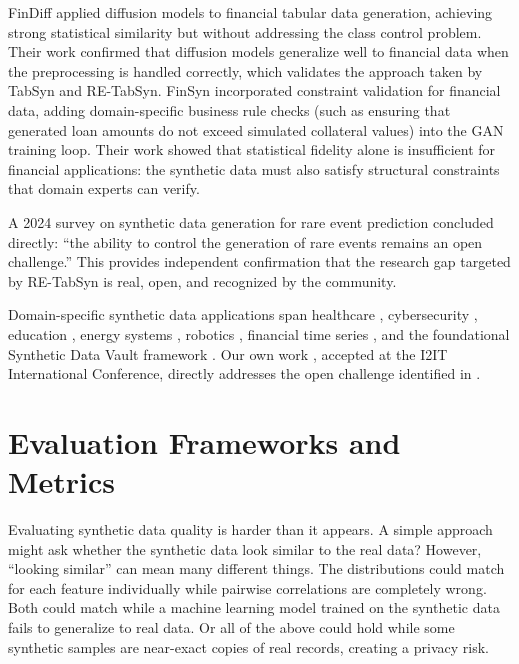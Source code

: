 FinDiff \cite{sattarov2023findiff} applied diffusion models to financial tabular data generation, achieving strong statistical similarity but without addressing the class control problem. Their work confirmed that diffusion models generalize well to financial data when the preprocessing is handled correctly, which validates the approach taken by TabSyn and RE-TabSyn. FinSyn \cite{chen2023finsyn} incorporated constraint validation for financial data, adding domain-specific business rule checks (such as ensuring that generated loan amounts do not exceed simulated collateral values) into the GAN training loop. Their work showed that statistical fidelity alone is insufficient for financial applications: the synthetic data must also satisfy structural constraints that domain experts can verify.

A 2024 survey on synthetic data generation for rare event prediction \cite{nidhi2024rare} concluded directly: ``the ability to control the generation of rare events remains an open challenge.'' This provides independent confirmation that the research gap targeted by RE-TabSyn is real, open, and recognized by the community.

Domain-specific synthetic data applications span healthcare \cite{theodorou2023ehrsafe, yuan2023scoehr, li2024ehr, li2024ehrdiff, gonzales2023synthetic, nikolenko2021synthetic, goyal2024raregraph, dahmen2019geneval}, cybersecurity \cite{dasgupta2024review, min2024novel}, education \cite{luo2024fairsynedu}, energy systems \cite{ge2024contextual}, robotics \cite{mahler2017dexnet}, financial time series \cite{takahashi2019gansfinance, sattarov2024leveraging}, and the foundational Synthetic Data Vault framework \cite{patki2016synthvault}. Our own work \cite{shroff2026retabsyn}, accepted at the I2IT International Conference, directly addresses the open challenge identified in \cite{nidhi2024rare}.

\section{Evaluation Frameworks and Metrics}

Evaluating synthetic data quality is harder than it appears. A simple approach might ask whether the synthetic data look similar to the real data? However, ``looking similar'' can mean many different things. The distributions could match for each feature individually while pairwise correlations are completely wrong. Both could match while a machine learning model trained on the synthetic data fails to generalize to real data. Or all of the above could hold while some synthetic samples are near-exact copies of real records, creating a privacy risk.

